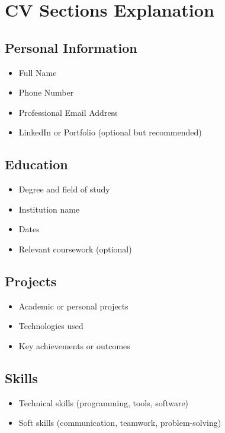 \documentclass[11pt,a4paper]{article}
\begin{document}
\section{CV Sections Explanation}

\subsection{Personal Information}
\begin{itemize}
    \item Full Name
    \item Phone Number
    \item Professional Email Address
    \item LinkedIn or Portfolio (optional but recommended)
\end{itemize}

\subsection{Education}
\begin{itemize}
    \item Degree and field of study
    \item Institution name
    \item Dates
    \item Relevant coursework (optional)
\end{itemize}

\subsection{Projects}
\begin{itemize}
    \item Academic or personal projects
    \item Technologies used
    \item Key achievements or outcomes
\end{itemize}

\subsection{Skills}
\begin{itemize}
    \item Technical skills (programming, tools, software)
    \item Soft skills (communication, teamwork, problem-solving)
\end{itemize}
\end{document}
